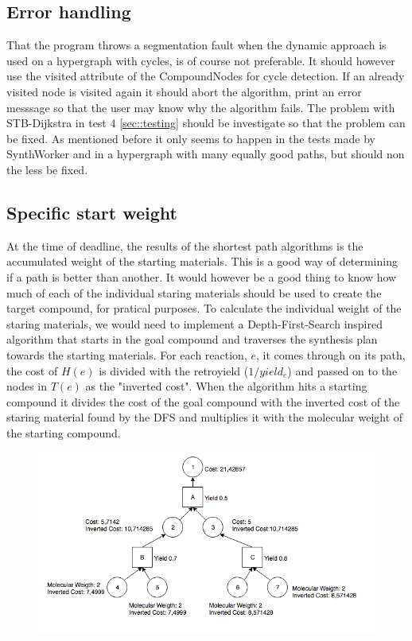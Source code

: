 \documentclass[a4paper,10pt,titlepage]{paper}
\begin{document}
\subsection{Error handling}
That the program throws a segmentation fault when the dynamic approach is used on a hypergraph with cycles, is of course not preferable. It should however use the visited attribute of the CompoundNodes for cycle detection. If an already visited node is visited again it should abort the algorithm, print an error messsage so that the user may know why the algorithm fails.
The problem with STB-Dijkstra in test 4 \ref{sec::testing} should be investigate so that the problem can be fixed. As mentioned before it only seems to happen in the tests made by SynthWorker and in a hypergraph with many equally good paths, but should non the less be fixed.
\subsection{Specific start weight}
At the time of deadline, the results of the shortest path algorithms is the accumulated weight of the starting materials. This is a good way of determining if a path is better than another. It would however be a good thing to know how much of each of the individual staring materials should be used to create the target compound, for pratical purposes. To calculate the individual weight of the staring materials, we would need to implement a Depth-First-Search inspired algorithm that starts in the goal compound and traverses the synthesis plan towards the starting materials. For each reaction, $e$, it comes through on its path, the cost of $H(e)$ is divided with the retroyield ($1/yield_e$) and passed on to the nodes in $T(e)$ as the "inverted cost". When the algorithm hits a starting compound it divides the cost of the goal compound with the inverted cost of the staring material found by the DFS and multiplies it with the molecular weight of the starting compound.
\begin{figure}[H]
\centering
\includegraphics[scale=0.5]{Billeder/StartingMaterialCalculation.png}
\end{figure}
\end{document}
